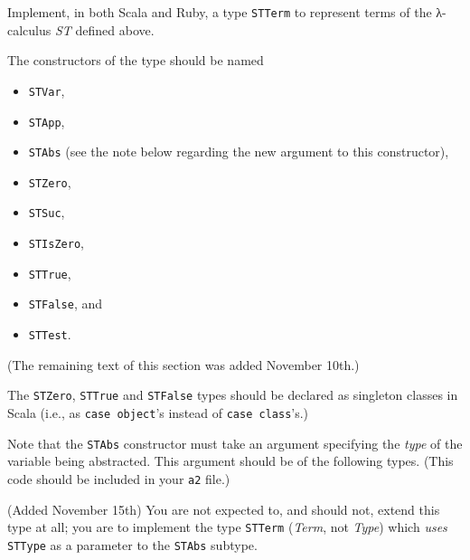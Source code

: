 \documentclass[11pt]{article}
\theoremstyle{definition}
\begin{document}
Implement, in both Scala and Ruby,
a type \texttt{STTerm} to represent terms of the λ-calculus \emph{ST} defined above.

The constructors of the type should be named
\begin{itemize}
\item \texttt{STVar},
\item \texttt{STApp},
\item \texttt{STAbs} (see the note below regarding the new argument to this constructor),
\item \texttt{STZero},
\item \texttt{STSuc},
\item \texttt{STIsZero},
\item \texttt{STTrue},
\item \texttt{STFalse}, and
\item \texttt{STTest}.
\end{itemize}

(The remaining text of this section was added November 10th.)

The \texttt{STZero}, \texttt{STTrue} and \texttt{STFalse} types should be declared as
singleton classes in Scala (i.e., as \texttt{case object}'s instead of \texttt{case class}'s.)

Note that the \texttt{STAbs} constructor must take an argument specifying
the \emph{type} of the variable being abstracted. This argument
should be of the following types.
(This code should be included in your \texttt{a2} file.)

(Added November 15th) You are not expected to, and should not,
extend this type at all; you are to implement
the type \texttt{STTerm} (\emph{Term}, not \emph{Type}) which \emph{uses} \texttt{STType} as a parameter
to the \texttt{STAbs} subtype.
\end{document}
